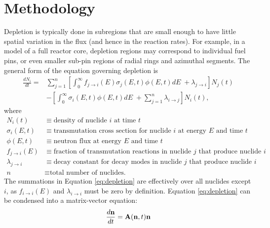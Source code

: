 \section{Methodology}
    \label{sec:methods}
    Depletion is typically done in subregions that are small enough to have
    little spatial variation in the flux (and hence in the reaction rates). For
    example, in a model of a full reactor core, depletion regions may correspond to
    individual fuel pins, or even smaller sub-pin regions of radial rings and
    azimuthal segments. The general form of the equation governing depletion is
    \begin{equation}
      \label{eq:depletion}
      \begin{split}
        \frac{dN_i}{dt} = &\sum\limits_{j=1}^n \left[ \int_0^\infty 
        f_{j \rightarrow i}(E) \sigma_j (E, t) \phi(E,t) dE \;+ \lambda_{j\rightarrow i}
        \right] N_j(t) \\ &- \left [\int_0^\infty \sigma_i (E,t) \phi(E,t) dE \; +
        \sum\limits_{j=1}^n \lambda_{i\rightarrow j} \right ] N_i(t),
      \end{split}
    \end{equation}
    where
    \begin{equation*}
      \begin{split}
        N_i(t) &\equiv \text{density of nuclide $i$ at time $t$} \\
        \sigma_i(E,t) &\equiv \text{transmutation cross section for nuclide $i$ at energy $E$ and time $t$} \\
        \phi(E,t) &\equiv \text{neutron flux at energy $E$ and time $t$} \\
        f_{j \rightarrow i}(E) &\equiv \text{fraction of transmutation reactions in nuclide $j$ that produce nuclide $i$} \\
        \lambda_{j \rightarrow i} &\equiv \text{decay constant for decay modes in nuclide $j$ that produce nuclide $i$} \\
        n &\equiv \text{total number of nuclides.}
      \end{split}
    \end{equation*}
    The summations in Equation \ref{eq:depletion} are effectively over all
    nuclides except $i$, as $f_{i \rightarrow i}(E)$ and $\lambda_{i \rightarrow i}$ must
    be zero by definition. Equation \ref{eq:depletion} can be condensed into a
    matrix-vector equation:
    \begin{equation}
      \label{eq:depletion-matrix-t}
      \frac{d\mathbf{n}}{dt} = \mathbf{A}(\mathbf{n},t)\mathbf{n}
    \end{equation}
